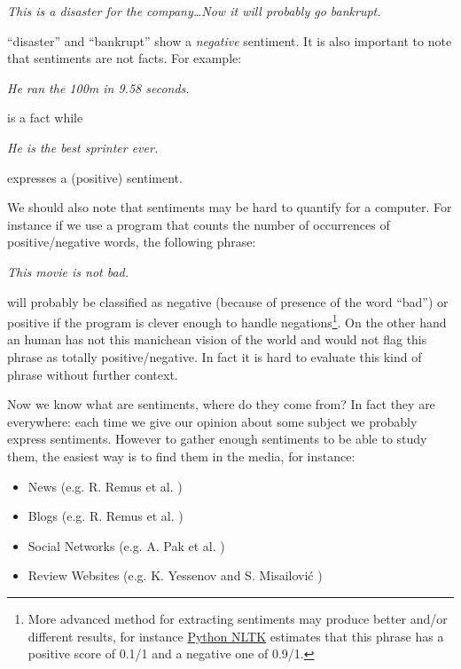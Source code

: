 \documentclass[12pt]{report}
\begin{document}
		\begin{center}
			\emph{This is a {\color{red}disaster} for the company\ldots Now it will probably go {\color{red}bankrupt}.}
		\end{center}
		
		``{\color{red}disaster}'' and ``{\color{red}bankrupt}'' show a \emph{negative} sentiment. It is also important to note that sentiments are not facts. For example:
		
		\begin{center}
			\emph{He ran the 100m in 9.58 seconds.}
		\end{center} is a fact while
		
		\begin{center}
			\emph{He is the best sprinter ever.}
		\end{center}
		
		expresses a (positive) sentiment.
		
		We should also note that sentiments may be hard to quantify for a computer. For instance if we use a program that counts the number of occurrences of positive/negative words, the following phrase:
		
		\begin{center}
			\emph{This movie is not bad.}
		\end{center}
		
		will probably be classified as negative (because of presence of the word ``bad'') or positive if the program is clever enough to handle negations\footnote{More advanced method for extracting sentiments may produce better and/or different results, for instance \href{http://text-processing.com/demo/sentiment/}{Python NLTK} estimates that this phrase has a positive score of 0.1/1 and a negative one of 0.9/1.}. On the other hand an human has not this manichean vision of the world and would not flag this phrase as totally positive/negative. In fact it is hard to evaluate this kind of phrase without further context.
		
		Now we know what are sentiments, where do they come from? In fact they are everywhere: each time we give our opinion about some subject we probably express sentiments. However to gather enough sentiments to be able to study them, the easiest way is to find them in the media, for instance:
		\begin{itemize}
			\item News (e.g. R. Remus et al. \cite{remus09})
			\item Blogs (e.g. R. Remus et al. \cite{remus09})
			\item Social Networks (e.g. A. Pak et al. \cite{pak10})
			\item Review Websites (e.g. K. Yessenov and S. Misailovi\'c \cite{yessenov09})
		\end{itemize}
		
\end{document}

